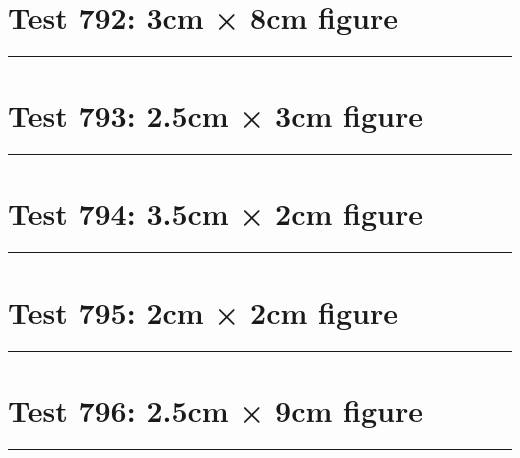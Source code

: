 \documentclass[a4paper,11pt]{article}
\begin{document}
\section*{Test 792: 3cm × 8cm figure}
\begin{swarmwrap}%
  \begin{minipage}[t]{3cm}
    \centering
    \rule{\linewidth}{8cm}
  \end{minipage}%
\end{swarmwrap}%
\swarmwrapnext
\lipsum[16]
\lipsum[17]
\lipsum[18]
\lipsum[19]
\section*{Test 793: 2.5cm × 3cm figure}
\begin{swarmwrap}%
  \begin{minipage}[t]{2cm}
    \centering
    \rule{\linewidth}{3cm}
  \end{minipage}%
\end{swarmwrap}%
\swarmwrapnext
\lipsum[31]
\lipsum[32]
\lipsum[33]
\lipsum[34]
\lipsum[35]
\lipsum[36]
\section*{Test 794: 3.5cm × 2cm figure}
\begin{swarmwrap}%
  \begin{minipage}[t]{3cm}
    \centering
    \rule{\linewidth}{2cm}
  \end{minipage}%
\end{swarmwrap}%
\swarmwrapnext
\lipsum[46]
\lipsum[47]
\lipsum[48]
\lipsum[49]
\lipsum[50]
\section*{Test 795: 2cm × 2cm figure}
\begin{swarmwrap}%
  \begin{minipage}[t]{2cm}
    \centering
    \rule{\linewidth}{2cm}
  \end{minipage}%
\end{swarmwrap}%
\swarmwrapnext
\lipsum[4]
\lipsum[5]
\lipsum[6]
\lipsum[7]
\section*{Test 796: 2.5cm × 9cm figure}
\begin{swarmwrap}%
  \begin{minipage}[t]{2cm}
    \centering
    \rule{\linewidth}{9cm}
  \end{minipage}%
\end{swarmwrap}%
\swarmwrapnext
\lipsum[135]
\lipsum[136]
\lipsum[137]
\lipsum[138]
\lipsum[139]
\end{document}
